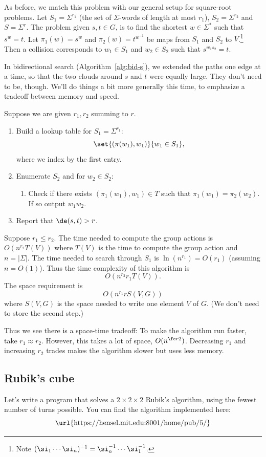 As before, we match this problem with our general setup for square-root problems. Let $S_1=\Sigma^{r_1}$ (the set of $\Sigma$-words of length at most $r_1$), $S_2=\Sigma^{r_2}$ and $S=\Sigma^r$. The problem given $s,t\in G$, is to find the shortest $w\in \Sigma^*$ such that $s^w=t$. Let $\pi_1(w)=s^w$ and $\pi_2(w)=t^{w^{-1}}$ be maps from $S_1$ and $S_2$ to $V$.\footnote{Note $(\si_1\cdots \si_n)^{-1}=\si_n^{-1}\cdots \si_1^{-1}$.} Then a collision corresponds to $w_1\in S_1$ and $w_2\in S_2$ such that $s^{w_1s_2}=t$.

In bidirectional search (Algorithm~\ref{alg:bid-s}), we extended the paths one edge at a time, so that the two clouds around $s$ and $t$ were equally large. They don't need to be, though. We'll do things a bit more generally this time, to emphasize a tradeoff between memory and speed.
\begin{alg}
Suppose we are given $r_1,r_2$ summing to $r$.
\begin{enumerate}
\item Build a lookup table for $S_1=\Sigma^{r_1}$:
\[
\set{(\pi(w_1),w_1)}{w_1\in S_1},
\]
where we index by the first entry.
\item Enumerate $S_2$ and for $w_2\in S_2$:
\begin{enumerate}
\item Check if there exists $(\pi_1(w_1),w_1)\in T$ such that $\pi_1(w_1)=\pi_2(w_2)$. If so output $w_1w_2$.
\end{enumerate}
\item Report that $\de(s,t)>r$.
\end{enumerate}
\end{alg}
Suppose $r_1\le r_2$.
The time needed to compute the group actions is $O(n^{r_2}T(V))$ where $T(V)$ is the time to compute the group action and $n=|\Sigma|$. The time needed to search through $S_1$ is $\ln (n^{r_1})=O(r_1)$ (assuming $n=O(1)$). Thus the time complexity of this algorithm is \[O(n^{r_2}r_1T(V)).\]
The space requirement is 
\[O(n^{r_1}rS(V,G))\]
where $S(V,G)$ is the space needed to write one element $V$ of $G$. (We don't need to store the second step.) 

Thus we see there is a space-time tradeoff: To make the algorithm run faster, take $r_1\approx r_2$. However, this takes a lot of space, $O(n^{\fc r2})$. Decreasing $r_1$ and increasing $r_2$ trades makes the algorithm slower but uses less memory.
\subsection{Rubik's cube}\label{sec:rubik}
Let's write a program that solves a $2\times 2\times 2$ Rubik's algorithm, using the fewest number of turns possible. You can find the algorithm implemented here:
\[
\text{\url{https://hensel.mit.edu:8001/home/pub/5/}}
\]

